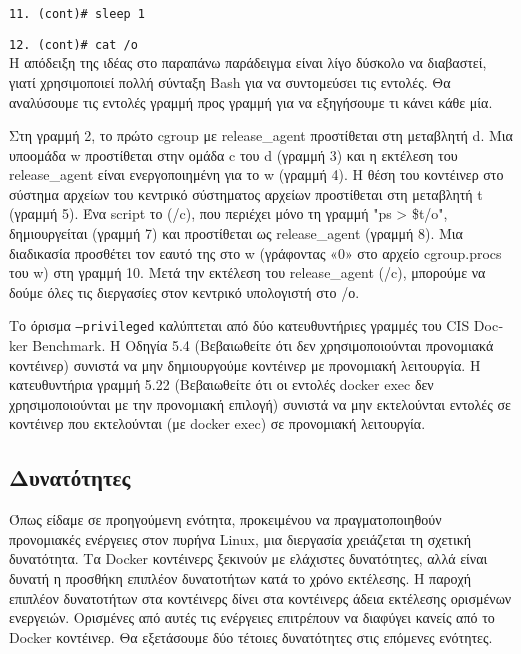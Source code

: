 \texttt{\textlatin{11. (cont)\# sleep 1}}

\texttt{\textlatin{12. (cont)\# cat /o}} \\

Η απόδειξη της ιδέας στο παραπάνω παράδειγμα είναι λίγο δύσκολο να διαβαστεί,
γιατί χρησιμοποιεί πολλή σύνταξη \textlatin{Bash} για να συντομεύσει τις
εντολές. Θα αναλύσουμε τις εντολές γραμμή προς γραμμή για να εξηγήσουμε τι
κάνει κάθε μία.

Στη γραμμή 2, το πρώτο \textlatin{cgroup} με \textlatin{release\_agent}
προστίθεται στη μεταβλητή \textlatin{d}. Μια υποομάδα \textlatin{w} προστίθεται
στην ομάδα \textlatin{c} του \textlatin{d} (γραμμή 3) και η εκτέλεση του
\textlatin{release\_agent} είναι ενεργοποιημένη για το \textlatin{w} (γραμμή 4).
Η θέση του κοντέινερ στο σύστημα αρχείων του κεντρικό σύστηματος αρχείων
προστίθεται στη μεταβλητή \textlatin{t} (γραμμή 5). Ένα \textlatin{script}
το (/\textlatin{c}), που περιέχει μόνο τη γραμμή "\textlatin{ps > \$t/o"},
δημιουργείται (γραμμή 7) και προστίθεται
ως \textlatin{release\_agent} (γραμμή 8). Μια διαδικασία προσθέτει τον εαυτό της
στο \textlatin{w} (γράφοντας «0» στο αρχείο \textlatin{cgroup.procs} του 
\textlatin{w}) στη γραμμή 10. Μετά την εκτέλεση του \textlatin{release\_agent}
(/\textlatin{c}), μπορούμε να δούμε όλες τις διεργασίες στον κεντρικό
υπολογιστή στο /\textlatin{ο}.

Το όρισμα \texttt{\textlatin{--privileged}} καλύπτεται από δύο κατευθυντήριες
γραμμές του \textlatin{CIS Docker Benchmark}. Η Οδηγία 5.4 (Βεβαιωθείτε ότι δεν
χρησιμοποιούνται προνομιακά κοντέινερ) συνιστά να μην δημιουργούμε κοντέινερ με
προνομιακή λειτουργία. Η κατευθυντήρια γραμμή 5.22 (Βεβαιωθείτε ότι οι εντολές
\textlatin{docker exec} δεν χρησιμοποιούνται με την προνομιακή επιλογή) συνιστά
να μην εκτελούνται εντολές σε κοντέινερ που εκτελούνται (με
\textlatin{docker exec}) σε προνομιακή λειτουργία.

\subsection{Δυνατότητες}

Όπως είδαμε σε προηγούμενη ενότητα, προκειμένου να πραγματοποιηθούν προνομιακές
ενέργειες στον πυρήνα \textlatin{Linux}, μια διεργασία χρειάζεται τη σχετική
δυνατότητα. Τα \textlatin{Docker} κοντέινερς ξεκινούν με ελάχιστες δυνατότητες,
αλλά είναι δυνατή η προσθήκη επιπλέον δυνατοτήτων κατά το χρόνο εκτέλεσης. Η
παροχή επιπλέον δυνατοτήτων στα κοντέινερς δίνει στα κοντέινερς άδεια εκτέλεσης
ορισμένων ενεργειών. Ορισμένες από αυτές τις ενέργειες επιτρέπουν να διαφύγει
κανείς από το \textlatin{Docker} κοντέινερ. Θα εξετάσουμε δύο τέτοιες
δυνατότητες στις επόμενες ενότητες.


